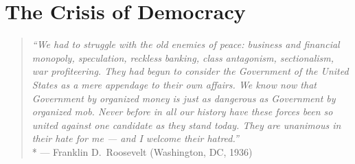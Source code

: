 

\section{The Crisis of Democracy}

\begin{quotation}
	\emph{``We had to struggle with the old enemies of peace:
	business and financial monopoly, speculation, reckless banking, class antagonism, sectionalism, war profiteering.
	They had begun to consider the Government of the United States as a mere appendage to their own affairs.
	We know now that Government by organized money is just as dangerous as Government by organized mob.
	Never before in all our history have these forces been so united against one candidate as they stand today.
	They are unanimous in their hate for me --- and I welcome their hatred.''}
	\\*
	--- Franklin D.\ Roosevelt (Washington, DC, 1936)
\end{quotation}




